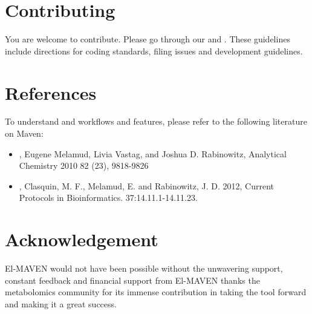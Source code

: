 \documentclass[letterpaper,10pt,english,openany,oneside]{sphinxmanual}
\begin{document}
\section{Contributing}
\label{\detokenize{Contributing:contributing}}\label{\detokenize{Contributing::doc}}
You are welcome to contribute. Please go through our  and . These guidelines include directions for coding standards, filing issues and development guidelines.


\section{References}
\label{\detokenize{References:references}}\label{\detokenize{References::doc}}
To understand  and  workflows and features, please refer to the following literature on Maven:
\begin{itemize}
\item {} 
, Eugene Melamud, Livia Vastag, and Joshua D. Rabinowitz, Analytical Chemistry 2010 82 (23), 9818-9826

\item {} 
, Clasquin, M. F., Melamud, E. and Rabinowitz, J. D. 2012, Current Protocols in Bioinformatics. 37:14.11.1-14.11.23.

\end{itemize}


\section{Acknowledgement}
\label{\detokenize{Acknowledgement:acknowledgement}}\label{\detokenize{Acknowledgement::doc}}
El-MAVEN would not have been possible without the unwavering support, constant feedback and financial support from  El-MAVEN thanks the metabolomics community for its immense contribution in taking the tool forward and making it a great success.
\end{document}
